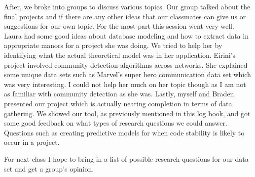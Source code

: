 \documentclass[conference]{IEEEtran}
\begin{document}
After, we broke into groups to discuss various topics. Our group talked about the final projects and if there are
any other ideas that our classmates can give us or suggestions for our own topic. For the most part this session went
very well. Laura had some good ideas about database modeling and how to extract data in appropriate manors for a project
she was doing. We tried to help her by identifying what the actual theoretical model was in her application. Eirini's
project involved community detection algorithms across networks. She explained some unique data sets such as Marvel's
super hero communication data set which was very interesting. I could not help her much on her topic though as I am
not as familiar with community detection as she was. Lastly, myself and Braden presented our project which is actually
nearing completion in terms of data gathering. We showed our tool, as previously mentioned in this log book, and got
some good feedback on what types of research questions we could answer. Questions such as creating predictive models
for when code stability is likely to occur in a project. 

For next class I hope to bring in a list of possible research questions for our data set and get a group's opinion.



\balance



\end{document}
